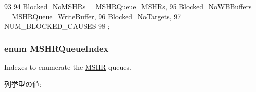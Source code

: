 \begin{DoxyCode}
93                       {
94         Blocked_NoMSHRs = MSHRQueue_MSHRs,
95         Blocked_NoWBBuffers = MSHRQueue_WriteBuffer,
96         Blocked_NoTargets,
97         NUM_BLOCKED_CAUSES
98     };
\end{DoxyCode}
\hypertarget{classBaseCache_a044898b3a082229405ecc19b5b26b144}{
\subsubsection[{MSHRQueueIndex}]{\setlength{\rightskip}{0pt plus 5cm}enum {\bf MSHRQueueIndex}}}
\label{classBaseCache_a044898b3a082229405ecc19b5b26b144}
Indexes to enumerate the \hyperlink{classMSHR}{MSHR} queues. \begin{Desc}
\item[列挙型の値: ]\par
\begin{description}
\item[{\em 
\hypertarget{classBaseCache_a044898b3a082229405ecc19b5b26b144ada8ec99f45021e0596a1bd0e9dfecfc2}{
MSHRQueue\_\-MSHRs}
\label{classBaseCache_a044898b3a082229405ecc19b5b26b144ada8ec99f45021e0596a1bd0e9dfecfc2}
}]\item[{\em 
\hypertarget{classBaseCache_a044898b3a082229405ecc19b5b26b144a0eb759fee101138752a64fb5932353f7}{
MSHRQueue\_\-WriteBuffer}
\label{classBaseCache_a044898b3a082229405ecc19b5b26b144a0eb759fee101138752a64fb5932353f7}
}]\end{description}
\end{Desc}




